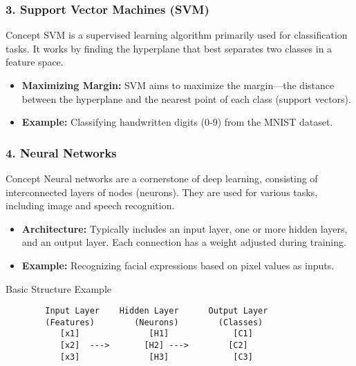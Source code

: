 \documentclass{beamer}
\begin{document}
\begin{frame}[fragile]
    \frametitle{3. Support Vector Machines (SVM)}
    \begin{block}{Concept}
        SVM is a supervised learning algorithm primarily used for classification tasks. It works by finding the hyperplane that best separates two classes in a feature space.
    \end{block}
    \begin{itemize}
        \item \textbf{Maximizing Margin:}  
            SVM aims to maximize the margin—the distance between the hyperplane and the nearest point of each class (support vectors).
        
        \item \textbf{Example:}  
            Classifying handwritten digits (0-9) from the MNIST dataset.
    \end{itemize}
\end{frame}

\begin{frame}[fragile]
    \frametitle{4. Neural Networks}
    \begin{block}{Concept}
        Neural networks are a cornerstone of deep learning, consisting of interconnected layers of nodes (neurons). They are used for various tasks, including image and speech recognition.
    \end{block}
    \begin{itemize}
        \item \textbf{Architecture:}  
            Typically includes an input layer, one or more hidden layers, and an output layer. Each connection has a weight adjusted during training.

        \item \textbf{Example:}  
            Recognizing facial expressions based on pixel values as inputs.
    \end{itemize}
    \begin{block}{Basic Structure Example}
        \begin{verbatim}
        Input Layer    Hidden Layer      Output Layer
        (Features)        (Neurons)        (Classes)
           [x1]              [H1]             [C1]
           [x2]  --->       [H2] --->        [C2]
           [x3]              [H3]             [C3]
        \end{verbatim}
    \end{block}
\end{frame}
\end{document}
